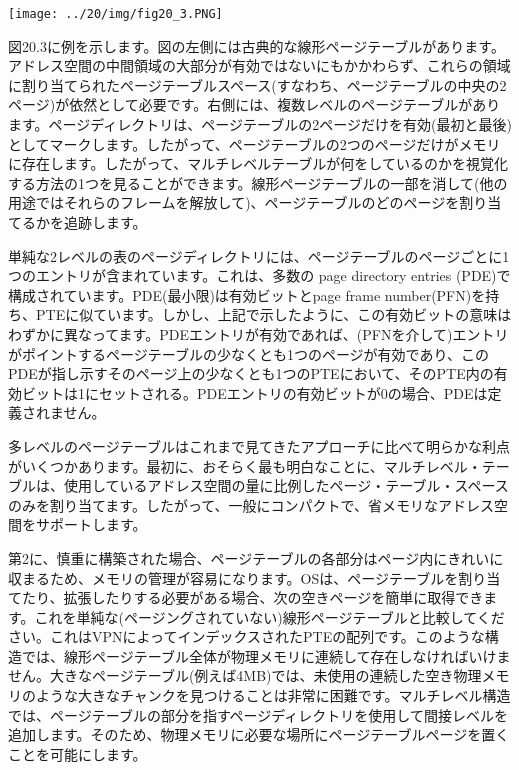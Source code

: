 \texttt{[image: ../20/img/fig20\_3.PNG]}

図20.3に例を示します。図の左側には古典的な線形ページテーブルがあります。アドレス空間の中間領域の大部分が有効ではないにもかかわらず、これらの領域に割り当てられたページテーブルスペース(すなわち、ページテーブルの中央の2ページ)が依然として必要です。右側には、複数レベルのページテーブルがあります。ページディレクトリは、ページテーブルの2ページだけを有効(最初と最後)としてマークします。したがって、ページテーブルの2つのページだけがメモリに存在します。したがって、マルチレベルテーブルが何をしているのかを視覚化する方法の1つを見ることができます。線形ページテーブルの一部を消して(他の用途ではそれらのフレームを解放して)、ページテーブルのどのページを割り当てるかを追跡します。

単純な2レベルの表のページディレクトリには、ページテーブルのページごとに1つのエントリが含まれています。これは、多数の
page directory entries
(PDE)で構成されています。PDE(最小限)は有効ビットとpage frame
number(PFN)を持ち、PTEに似ています。しかし、上記で示したように、この有効ビットの意味はわずかに異なってます。PDEエントリが有効であれば、(PFNを介して)エントリがポイントするページテーブルの少なくとも1つのページが有効であり、このPDEが指し示すそのページ上の少なくとも1つのPTEにおいて、そのPTE内の有効ビットは1にセットされる。PDEエントリの有効ビットが0の場合、PDEは定義されません。

多レベルのページテーブルはこれまで見てきたアプローチに比べて明らかな利点がいくつかあります。最初に、おそらく最も明白なことに、マルチレベル・テーブルは、使用しているアドレス空間の量に比例したページ・テーブル・スペースのみを割り当てます。したがって、一般にコンパクトで、省メモリなアドレス空間をサポートします。

第2に、慎重に構築された場合、ページテーブルの各部分はページ内にきれいに収まるため、メモリの管理が容易になります。OSは、ページテーブルを割り当てたり、拡張したりする必要がある場合、次の空きページを簡単に取得できます。これを単純な(ページングされていない)線形ページテーブルと比較してください。これはVPNによってインデックスされたPTEの配列です。このような構造では、線形ページテーブル全体が物理メモリに連続して存在しなければいけません。大きなページテーブル(例えば4MB)では、未使用の連続した空き物理メモリのような大きなチャンクを見つけることは非常に困難です。マルチレベル構造では、ページテーブルの部分を指すページディレクトリを使用して間接レベルを追加します。そのため、物理メモリに必要な場所にページテーブルページを置くことを可能にします。

